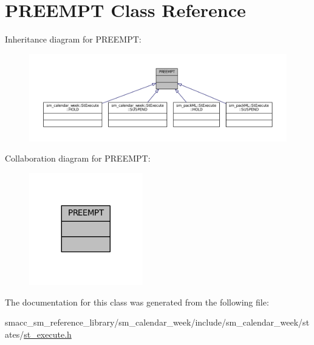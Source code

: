 \hypertarget{classPREEMPT}{}\section{P\+R\+E\+E\+M\+PT Class Reference}
\label{classPREEMPT}


Inheritance diagram for P\+R\+E\+E\+M\+PT\+:
\nopagebreak
\begin{figure}[H]
\begin{center}
\leavevmode
\includegraphics[width=350pt]{classPREEMPT__inherit__graph}
\end{center}
\end{figure}


Collaboration diagram for P\+R\+E\+E\+M\+PT\+:
\nopagebreak
\begin{figure}[H]
\begin{center}
\leavevmode
\includegraphics[width=140pt]{classPREEMPT__coll__graph}
\end{center}
\end{figure}


The documentation for this class was generated from the following file\+:\begin{DoxyCompactItemize}
\item 
smacc\+\_\+sm\+\_\+reference\+\_\+library/sm\+\_\+calendar\+\_\+week/include/sm\+\_\+calendar\+\_\+week/states/\hyperlink{sm__calendar__week_2include_2sm__calendar__week_2states_2st__execute_8h}{st\+\_\+execute.\+h}\end{DoxyCompactItemize}
